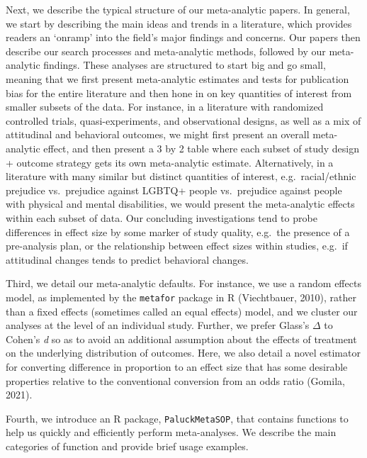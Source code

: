 \documentclass[
  man]{apa6}
\begin{document}
Next, we describe the typical structure of our meta-analytic papers. In general, we start by describing the main ideas and trends in a literature, which provides readers an `onramp' into the field's major findings and concerns. Our papers then describe our search processes and meta-analytic methods, followed by our meta-analytic findings. These analyses are structured to start big and go small, meaning that we first present meta-analytic estimates and tests for publication bias for the entire literature and then hone in on key quantities of interest from smaller subsets of the data. For instance, in a literature with randomized controlled trials, quasi-experiments, and observational designs, as well as a mix of attitudinal and behavioral outcomes, we might first present an overall meta-analytic effect, and then present a 3 by 2 table where each subset of study design + outcome strategy gets its own meta-analytic estimate. Alternatively, in a literature with many similar but distinct quantities of interest, e.g.~racial/ethnic prejudice vs.~prejudice against LGBTQ+ people vs.~prejudice against people with physical and mental disabilities, we would present the meta-analytic effects within each subset of data. Our concluding investigations tend to probe differences in effect size by some marker of study quality, e.g.~the presence of a pre-analysis plan, or the relationship between effect sizes within studies, e.g.~if attitudinal changes tends to predict behavioral changes.

Third, we detail our meta-analytic defaults. For instance, we use a random effects model, as implemented by the \texttt{metafor} package in R (Viechtbauer, 2010), rather than a fixed effects (sometimes called an equal effects) model, and we cluster our analyses at the level of an individual study. Further, we prefer Glass's \(\Delta\) to Cohen's \emph{d} so as to avoid an additional assumption about the effects of treatment on the underlying distribution of outcomes. Here, we also detail a novel estimator for converting difference in proportion to an effect size that has some desirable properties relative to the conventional conversion from an odds ratio (Gomila, 2021).

Fourth, we introduce an R package, \texttt{PaluckMetaSOP}, that contains functions to help us quickly and efficiently perform meta-analyses. We describe the main categories of function and provide brief usage examples.
\end{document}
